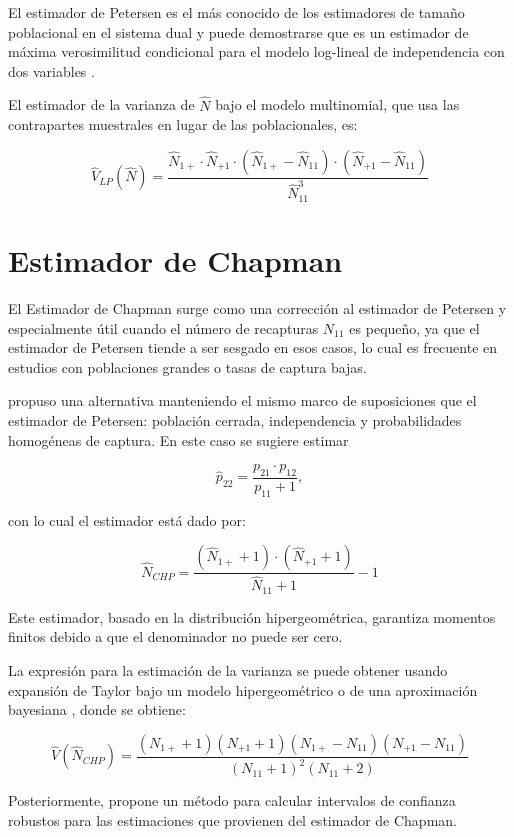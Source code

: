 \documentclass[
  12pt,
]{book}
\begin{document}
El estimador de Petersen es el más conocido de los estimadores de tamaño poblacional en el sistema dual y puede demostrarse que es un estimador de máxima verosimilitud condicional para el modelo log-lineal de independencia con dos variables \citep{fienberg1972multiple, bishop2007discrete}.

El estimador de la varianza de \(\hat{N}\) bajo el modelo multinomial, que usa las contrapartes muestrales en lugar de las poblacionales, es:

\[
\hat{V}_{LP}(\hat{N}) = \frac{\hat{N}_{1+} \cdot \hat{N}_{+1} \cdot (\hat{N}_{1+} - \hat{N}_{11}) \cdot (\hat{N}_{+1} - \hat{N}_{11})}{\hat{N}_{11}^3}
\]

\section{Estimador de Chapman}\label{estimador-de-chapman}

El Estimador de Chapman surge como una corrección al estimador de Petersen y especialmente útil cuando el número de recapturas \(N_{11}\) es pequeño, ya que el estimador de Petersen tiende a ser sesgado en esos casos, lo cual es frecuente en estudios con poblaciones grandes o tasas de captura bajas.

\citet{chapman1951some} propuso una alternativa manteniendo el mismo marco de suposiciones que el estimador de Petersen: población cerrada, independencia y probabilidades homogéneas de captura. En este caso se sugiere estimar

\[ \hat{p}_{22} = \frac{p_{21}\cdot p_{12}}{p_{11} + 1},\]

con lo cual el estimador está dado por:

\[\hat{N}_{CHP} = \frac{(\hat{N}_{1+}  + 1) \cdot (\hat{N}_{+1} + 1)}{\hat{N}_{11} + 1} - 1 \]

Este estimador, basado en la distribución hipergeométrica, garantiza momentos finitos debido a que el denominador no puede ser cero.

La expresión para la estimación de la varianza se puede obtener usando expansión de Taylor bajo un modelo hipergeométrico o de una aproximación bayesiana \citep{seber1982estimation}, donde se obtiene:

\[\hat{V}(\hat{N}_{CHP}) = \frac{(N_{1+} + 1)(N_{+1} + 1)(N_{1+} - N_{11})(N_{+1} - N_{11})}{(N_{11} + 1)^2 (N_{11} + 2)}\]

Posteriormente, \citet{sadinle2009transformed} propone un método para calcular intervalos de confianza robustos para las estimaciones que provienen del estimador de Chapman.
\end{document}

